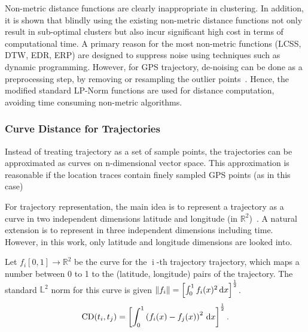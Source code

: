 Non-metric distance functions are clearly inappropriate in clustering. In addition, it is shown that blindly using the existing non-metric distance functions not only result in sub-optimal clusters but also incur significant high cost in terms of computational time. A primary reason for the most non-metric functions (LCSS, DTW, EDR, ERP) are designed to suppress noise using techniques such as dynamic programming. However, for GPS trajectory, de-noising can be done as a preprocessing step, by removing or resampling the outlier points~\cite{Yuan2013,Zheng2009}. Hence, the modified standard LP-Norm functions are used for distance computation, avoiding time consuming non-metric algorithms.

\subsubsection{Curve Distance for Trajectories}
Instead of treating trajectory as a set of sample points, the trajectories can be approximated as curves on n-dimensional vector space. This approximation is reasonable if the location traces contain finely sampled GPS points (as in this case)%

For trajectory representation, the main idea is to represent a trajectory as a curve in two independent dimensions latitude and longitude (in $\mathbb{R}^2$)~\cite{Kurtek2012}. A natural extension is to represent in three independent dimensions including time. However, in this work, only latitude and longitude dimensions are looked into. %

Let $f_i[0,1] \rightarrow \mathbb{R}^2$ be the curve for the $\operatorname{i}$-th trajectory trajectory, which maps a number between 0 to 1 to the (latitude, longitude) pairs of the trajectory. The standard $\mathbb{L}^2$ norm for this curve is given $\left\lVert f_i\right\rVert = \left[ \int_{0}^{1}{f_i(x)^2\, \mathrm{d}x }\right] ^ {\frac{1}{2}}$. %
\begin{align}
\operatorname{CD}(t_i,t_j) = \left[ \int_{0}^{1}{\left(f_i(x) - f_j(x) \right )^2\, \mathrm{d}x }\right] ^ {\frac{1}{2}}.
\end{align}

